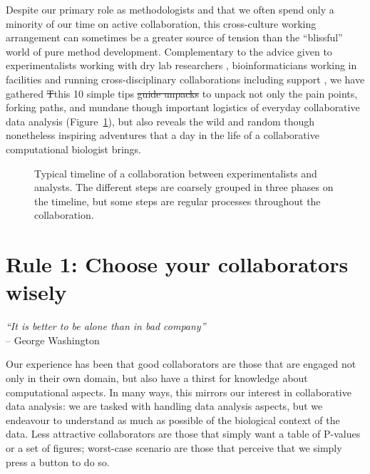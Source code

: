 \documentclass{article}
\begin{document}
 Despite our primary role as methodologists and that we often spend only a minority of our time on active collaboration, this cross-culture working arrangement can sometimes be a greater source of tension than the ``blissful'' world of pure method development. {\color{red} Complementary to the advice given to experimentalists working with dry lab researchers \cite{cechova2020ten}, bioinformaticians working in facilities \cite{aron2021ten} and running cross-disciplinary collaborations including support \cite{knapp2015ten,kumuthini2020ten}, we have gathered \sout{T}this 10 simple tips \sout{guide unpacks} to unpack} not only the pain points, forking paths, and mundane though important logistics of everyday collaborative data analysis (Figure~\ref{fig:figure1}), but also reveals the wild and random though nonetheless inspiring adventures that a day in the life of a collaborative computational biologist brings.

\clearpage

\begin{figure}[h]
  \centering
  \caption{Typical timeline of a collaboration between experimentalists and analysts. The different steps are coarsely grouped in three phases on the timeline, but some steps are regular processes throughout the collaboration.}
  \label{fig:figure1}
\end{figure}

\section*{Rule 1: Choose your collaborators wisely} %
\label{rule1_choose}

\begin{flushright}
\rightskip=1cm\textit{``It is better to be alone than in bad company''} \\
\vspace{.2em}
\rightskip=0cm -- George Washington
\end{flushright}

Our experience has been that good collaborators are those that are engaged not only in their own domain, but also have a thirst for knowledge about computational aspects. In many ways, this mirrors our interest in collaborative data analysis: we are tasked with handling data analysis aspects, but we endeavour to understand as much as possible of the biological context of the data. Less attractive collaborators are those that simply want a table of P-values or a set of figures; worst-case scenario are those that perceive that we simply press a button to do so. 
\end{document}

